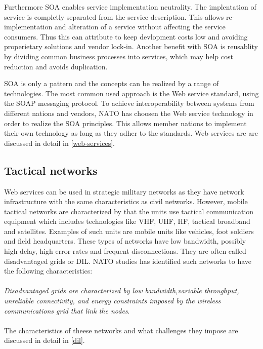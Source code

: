 \documentclass[USenglish]{article}
\begin{document}
Furthermore SOA enables service implementation neutrality. The implentation of service is completly separated from the service description. This allows re-implementation and alteration of a service without affecting the service consumers. Thus this can attribute to keep devlopment costs low and avoiding properietary solutions and vendor lock-in. Another benefit with SOA is reusablity by dividing common business processes into services, which may help cost reduction and avoids duplication. 

SOA is only a pattern and the concepts can be realized by a range of technologies. The most common used approach is the Web service standard, using the SOAP messaging protocol. To achieve interoperability between systems from different nations and vendors, NATO has choosen the Web service technology in order to realize the SOA principles. This allows member nations to implement their own technology as long as they adher to the standards. Web services are are discussed in detail in \cref{web-services}.

\subsection{Tactical networks}
Web services can be used in strategic military networks as they have network infrastructure with the same characteristics as civil networks. However, mobile tactical networks are characterized by that the units use tactical communication equipment which includes technologies like VHF, UHF, HF, tactical broadband and satellites. Examples of such units are mobile units like vehicles, foot soldiers and field headquarters. These types of networks have low bandwidth, possibly high delay, high error rates and frequent disconnections. They are often called disadvantaged grids or DIL. NATO studies has identified such networks to have the following characteristics:

\paragraph{}
\textit{Disadvantaged grids are characterized by low bandwidth,variable throughput, unreliable connectivity, and energy constraints imposed by the wireless communications grid that link the nodes}\cite{nato-disadvantaged-grids}.

\paragraph{}
The characteristics of theese networks and what challenges they impose are discussed in detail in \cref{dil}.
\end{document}
